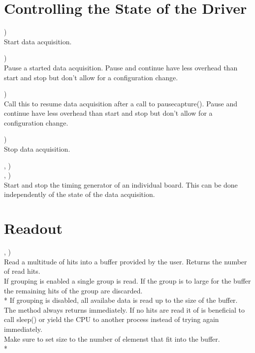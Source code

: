 	\section{Controlling the State of the Driver}
		\device)\\
		Start data acquisition.\par

		\device)\\
		Pause a started data acquisition. 
		Pause and continue have less overhead than start and stop but don't allow for a configuration change.\par

		\device)\\
		Call this to resume data acquisition after a call to \textsf{\prefix pause\tu capture()}.
		Pause and continue have less overhead than start and stop but don't allow for a configuration change.\par

		\device)\\
		Stop data acquisition.\par

		\device, )\\
		\device, )\\
		Start and stop the timing generator of an individual board. 
		This can be done independently of the state of the data acquisition.\par	


\section{Readout}

\device,    )\\
Read a multitude of hits into a buffer provided by the user. Returns the number of read hits.\\
If grouping is enabled a single group is read. 
If the group is to large for the buffer the remaining hits of the group are discarded.\\*
If grouping is disabled, all availabe data is read up to the size of the buffer. \\
The method always returns immediately. If no hits are read it of is beneficial to call \textsf{sleep()} 
or yield the CPU to another process instead of trying again immediately.\\
Make sure to set \textsf{size} to the number of elemenst that fit into the buffer.\\*




